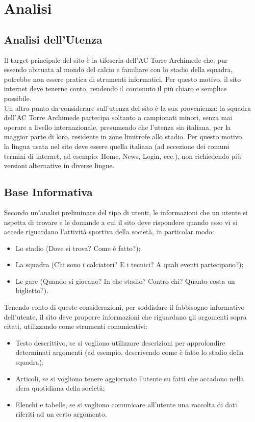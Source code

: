 \section{Analisi}
    \subsection{Analisi dell'Utenza}
    Il target principale del sito è la tifoseria dell'AC Torre Archimede che, pur essendo abituata al mondo del calcio e familiare con lo stadio della squadra, potrebbe non essere pratica di strumenti informatici. Per questo motivo, il sito internet deve tenerne conto, rendendo il contenuto il più chiaro e semplice possibile.\\
    Un altro punto da considerare sull'utenza del sito è la sua provenienza: la squadra dell'AC Torre Archimede partecipa soltanto a campionati minori, senza mai operare a livello internazionale, presumendo che l'utenza sia italiana, per la maggior parte di loro, residente in zone limitrofe allo stadio. Per questo motivo, la lingua usata nel sito deve essere quella italiana (ad eccezione dei comuni termini di internet, ad esempio: Home, News, Login, ecc.), non richiedendo più versioni alternative in diverse lingue.

    \subsection{Base Informativa}
    Secondo un'analisi preliminare del tipo di utenti, le informazioni che un utente si aspetta di trovare e le domande a cui il sito deve rispondere quando esso vi si accede riguardano l'attività sportiva della società, in particolar modo:
    
    \begin{itemize}
        \item Lo stadio (Dove si trova? Come è fatto?);
        \item La squadra (Chi sono i calciatori? E i tecnici? A quali eventi partecipano?);
        \item Le gare (Quando si giocano? In che stadio? Contro chi? Quanto costa un biglietto?).
    \end{itemize}
    
    \noindent
    Tenendo conto di queste considerazioni, per soddisfare il fabbisogno informativo dell'utente, il sito deve proporre informazioni che riguardano gli argomenti sopra citati, utilizzando come strumenti comunicativi:
    
    \begin{itemize}
        \item Testo descrittivo, se si vogliono utilizzare descrizioni per approfondire determinati argomenti (ad esempio, descrivendo come è fatto lo stadio della squadra);
        \item Articoli, se si vogliono tenere aggiornato l'utente su fatti che accadono nella sfera quotidiana della società;
        \item Elenchi e tabelle, se si vogliono comunicare all'utente una raccolta di dati riferiti ad un certo argomento.
    \end{itemize}


